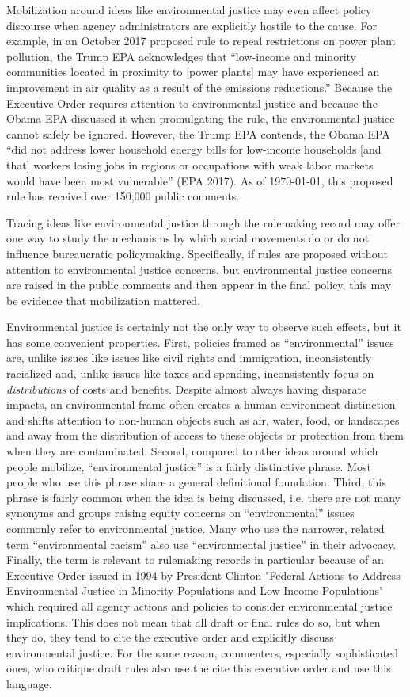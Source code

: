 Mobilization around ideas like environmental justice may even affect policy discourse when agency administrators are explicitly hostile to the cause. For example, in an October 2017 proposed rule to repeal restrictions on power plant pollution, the Trump EPA acknowledges that ``low-income and minority communities located in proximity to [power plants] may have experienced an improvement in air quality as a result of the emissions reductions.'' Because the Executive Order requires attention to environmental justice and because the Obama EPA discussed it when promulgating the rule, the environmental justice cannot safely be ignored. However,  the Trump EPA contends, the Obama EPA ``did not address lower household energy bills for low-income households [and that] workers losing jobs in regions or occupations with weak labor markets would have been most vulnerable'' (EPA 2017). As of \today, this proposed rule has received over 150,000 public comments. 

Tracing ideas like environmental justice through the rulemaking record may offer one way to study the mechanisms by which social movements do or do not influence bureaucratic policymaking. Specifically, if rules are proposed without attention to environmental justice concerns, but environmental justice concerns are raised in the public comments and then appear in the final policy, this may be evidence that mobilization mattered.

Environmental justice is certainly not the only way to observe such effects, but it has some convenient properties. First, policies framed as ``environmental'' issues are, unlike issues like issues like civil rights and immigration, inconsistently racialized and, unlike issues like taxes and spending, inconsistently focus on \textit{distributions} of costs and benefits. Despite almost always having disparate impacts, an environmental frame often creates a human-environment distinction and shifts attention to non-human objects such as air, water, food, or landscapes and away from the distribution of access to these objects or protection from them when they are contaminated. Second, compared to other ideas around which people mobilize, ``environmental justice'' is a fairly distinctive phrase. Most people who use this phrase share a general definitional foundation. Third, this phrase is fairly common when the idea is being discussed, i.e. there are not many synonyms and groups raising equity concerns on ``environmental'' issues commonly refer to environmental justice.  Many who use the narrower, related term ``environmental racism'' also use ``environmental justice'' in their advocacy.  Finally, the term is relevant to rulemaking records in particular because of an Executive Order issued in 1994 by President Clinton "Federal Actions to Address Environmental Justice in Minority Populations and Low-Income Populations" which required all agency actions and policies to consider environmental justice implications. This does not mean that all draft or final rules do so, but when they do, they tend to cite the executive order and explicitly discuss environmental justice. For the same reason, commenters, especially sophisticated ones, who critique draft rules also use the cite this executive order and use this language. 

